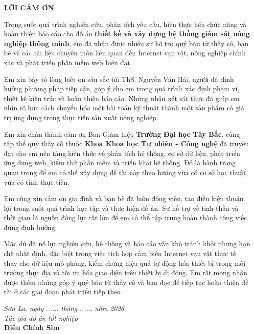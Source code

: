 \documentclass[13pt,a4paper]{extarticle}
\numberwithin{figure}{section}
\numberwithin{table}{section}
\newcommand{\studentname}{Điêu Chính Sim}
\newcommand{\advisorname}{ThS. Nguyễn Văn Hải}
\begin{document}
	
	\setcounter{page}{1}
	\pagestyle{plain}
	\begin{center}
		\fontsize{14pt}{20pt}\selectfont
		\textbf{LỜI CẢM ƠN}
	\end{center}
	
	\vspace{20pt}
	
	Trong suốt quá trình nghiên cứu, phân tích yêu cầu, hiện thực hóa chức năng và hoàn thiện báo cáo cho đồ án \textbf{thiết kế và xây dựng hệ thống giám sát nông nghiệp thông minh}, em đã nhận được nhiều sự hỗ trợ quý báu từ thầy cô, bạn bè và các tài liệu chuyên môn liên quan đến Internet vạn vật, nông nghiệp chính xác và phát triển phần mềm web hiện đại.
	
	Em xin bày tỏ lòng biết ơn sâu sắc tới \advisorname, người đã định hướng phương pháp tiếp cận, góp ý cho em trong quá trình xác định phạm vi, thiết kế kiến trúc và hoàn thiện báo cáo. Những nhận xét sát thực đã giúp em nhìn rõ hơn cách chuyển hóa một bài toán kỹ thuật thành một sản phẩm có giá trị ứng dụng trong thực tiễn sản xuất nông nghiệp.
	
	Em xin chân thành cảm ơn Ban Giám hiệu \textbf{Trường Đại học Tây Bắc}, cùng tập thể quý thầy cô thuộc \textbf{Khoa Khoa học Tự nhiên - Công nghệ} đã truyền đạt cho em nền tảng kiến thức về phân tích hệ thống, cơ sở dữ liệu, phát triển ứng dụng web, kiểm thử phần mềm và triển khai hệ thống. Đó là hành trang quan trọng để em có thể xây dựng đề tài này theo hướng vừa có cơ sở học thuật, vừa có tính thực tiễn.
	
	Em cũng xin cảm ơn gia đình và bạn bè đã luôn động viên, tạo điều kiện thuận lợi trong suốt quá trình học tập và thực hiện đồ án. Sự hỗ trợ về tinh thần và thời gian là nguồn động lực rất lớn để em có thể tập trung hoàn thành công việc đúng định hướng.
	
	Mặc dù đã nỗ lực nghiên cứu, hệ thống và báo cáo vẫn khó tránh khỏi những hạn chế nhất định, đặc biệt trong việc tích hợp cảm biến Internet vạn vật thực tế thay cho dữ liệu mô phỏng, kiểm chứng hiệu quả tự động hóa thiết bị trong môi trường thực địa và tối ưu hóa giao diện trên thiết bị di động. Em rất mong nhận được thêm những góp ý quý báu từ thầy cô và bạn đọc để tiếp tục hoàn thiện đề tài ở các giai đoạn phát triển tiếp theo.
	
	\vspace{30pt}
	
	\begin{flushright}
		\textit{Sơn La, ngày ...... tháng ...... năm 2026}\\[10pt]
		\textit{Tác giả đồ án tốt nghiệp}\\[30pt]
		\textbf{\studentname}
	\end{flushright}
	
\end{document}
